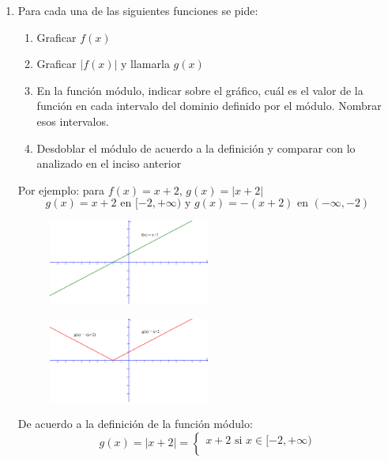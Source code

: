 \documentclass[12pt]{article}
\theoremstyle{definition}
\begin{document}
\begin{enumerate}
\item Para cada una de las siguientes funciones se pide:
\begin{enumerate}
\item Graficar $f(x)$ 
\item Graficar $|f(x)|$ y llamarla $g(x)$ 
\item En la función módulo, indicar sobre el gráfico, cuál es el valor de la función en cada intervalo del dominio definido por el módulo. Nombrar esos intervalos.
\item Desdoblar el módulo de acuerdo a la definición y comparar con lo analizado en el inciso anterior
\end{enumerate}
\noindent
Por ejemplo: para $f(x) = x+2$, $g(x) = |x + 2|$ \\
\begin{equation*}
        g(x) = x + 2  \text{ en }  [ -2,+\infty)   \text{ y }  g(x) = -(x + 2)  \text{ en }  (-\infty, -2) 
\end{equation*}
\vspace{0.3 cm}
\begin{multicols}{2}
\begin{figure}[H]
\centering
\includegraphics[width=0.5\textwidth]{X+2.png}
\end{figure}
\begin{figure}[H]
\centering
\includegraphics[width=0.5\textwidth]{MODX+2.png}
\end{figure}
\end{multicols}
\noindent
De acuerdo a la definición de la función módulo:
\begin{equation*}
         g(x) = |x +2| = \left \{
	\begin{aligned}
	x+2  \text{ si }  x \in [ -2,+\infty) \\

\end{aligned}
\end{equation*}
\end{enumerate}
\end{document}
